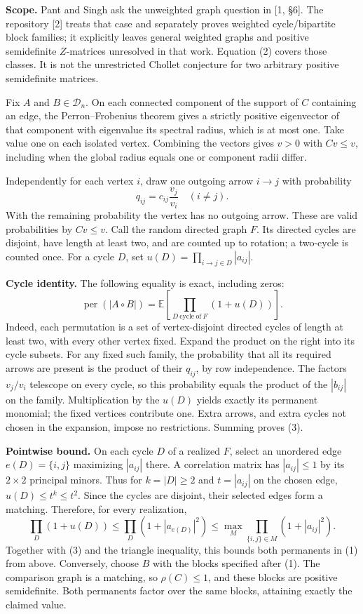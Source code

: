 \documentclass[11pt]{article}
\newcommand{\shead}[1]{\par\vspace{4pt}{\large\bfseries\sffamily\color{ink}#1}\par}
\newcommand{\per}{\operatorname{per}}
\newcommand{\dd}{\mathcal D_n}
\begin{document}
\textbf{Scope.} Pant and Singh ask the unweighted graph question in [1, \S6]. The repository [2] treats that case and separately proves weighted cycle/bipartite block families; it explicitly leaves general weighted graphs and positive semidefinite $Z$-matrices unresolved in that work. Equation (2) covers those classes. It is not the unrestricted Chollet conjecture for two arbitrary positive semidefinite matrices.
\newpage
\shead{2. From random arrows to a matching}
Fix $A$ and $B\in\dd$. On each connected component of the support of $C$ containing an edge, the Perron--Frobenius theorem gives a strictly positive eigenvector of that component with eigenvalue its spectral radius, which is at most one. Take value one on each isolated vertex. Combining the vectors gives $v>0$ with $Cv\le v$, including when the global radius equals one or component radii differ.

Independently for each vertex $i$, draw one outgoing arrow $i\to j$ with probability
\[
 q_{ij}=c_{ij}\frac{v_j}{v_i}\quad(i\ne j).
\]
With the remaining probability the vertex has no outgoing arrow. These are valid probabilities by $Cv\le v$. Call the random directed graph $F$. Its directed cycles are disjoint, have length at least two, and are counted up to rotation; a two-cycle is counted once. For a cycle $D$, set $u(D)=\prod_{i\to j\in D}|a_{ij}|$.

\textbf{Cycle identity.} The following equality is exact, including zeros:
\begin{equation}
\per(|A\circ B|)=
 \mathbb E\!\left[\prod_{D\ \mathrm{cycle\ of}\ F}(1+u(D))\right].
\end{equation}
Indeed, each permutation is a set of vertex-disjoint directed cycles of length at least two, with every other vertex fixed. Expand the product on the right into its cycle subsets. For any fixed such family, the probability that all its required arrows are present is the product of their $q_{ij}$, by row independence. The factors $v_j/v_i$ telescope on every cycle, so this probability equals the product of the $|b_{ij}|$ on the family. Multiplication by the $u(D)$ yields exactly its permanent monomial; the fixed vertices contribute one. Extra arrows, and extra cycles not chosen in the expansion, impose no restrictions. Summing proves (3).

\textbf{Pointwise bound.} On each cycle $D$ of a realized $F$, select an unordered edge $e(D)=\{i,j\}$ maximizing $|a_{ij}|$ there. A correlation matrix has $|a_{ij}|\le1$ by its $2\times2$ principal minors. Thus for $k=|D|\ge2$ and $t=|a_{ij}|$ on the chosen edge, $u(D)\le t^k\le t^2$. Since the cycles are disjoint, their selected edges form a matching. Therefore, for every realization,
\[
 \prod_D(1+u(D))\le \prod_D(1+|a_{e(D)}|^2)
 \le \max_M\prod_{\{i,j\}\in M}(1+|a_{ij}|^2).
\]
Together with (3) and the triangle inequality, this bounds both permanents in (1) from above. Conversely, choose $B$ with the blocks specified after (1). The comparison graph is a matching, so $\rho(C)\le1$, and these blocks are positive semidefinite. Both permanents factor over the same blocks, attaining exactly the claimed value.
\end{document}
